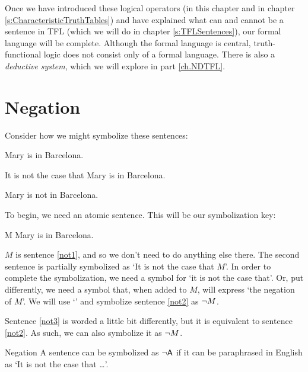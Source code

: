 Once we have introduced these logical operators (in this chapter and in chapter \ref{s:CharacteristicTruthTables}) and have explained what can and cannot be a sentence in TFL (which we will do in chapter \ref{s:TFLSentences}), our formal language will be complete. Although the formal language is central, truth-functional logic does not consist only of a formal language. There is also a \textit{deductive system}, which we will explore in part \ref{ch.NDTFL}. 

        
\section{Negation}

Consider how we might symbolize these sentences:
	\begin{earg}
	\item[\ex{not1}] Mary is in Barcelona.
	\item[\ex{not2}] It is not the case that Mary is in Barcelona.
	\item[\ex{not3}] Mary is not in Barcelona.
	\end{earg}
To begin, we need an atomic sentence. This will be our symbolization key:
	\begin{ekey}
		\item[M] Mary is in Barcelona.
	\end{ekey}
	
$M$ is sentence \ref{not1}, and so we don't need to do anything else there. 
The second sentence is partially symbolized as `It is not the case that $M$'. In order to complete the symbolization, we need a symbol for `it is not the case that'. Or, put differently, we need a symbol that, when added to $M$, will express `the negation of $M$'. We will use `\enot' and symbolize sentence \ref{not2} as ${\neg} M$.

Sentence \ref{not3} is worded a little bit differently, but it is equivalent to sentence \ref{not2}. As such, we can also symbolize it as ${\neg} M$.

\begin{factboxy}{Negation}
A sentence can be symbolized as ${\neg}\mathsf{A}$ if it can be paraphrased in English as `It is not the case that \ldots '.
\end{factboxy}

